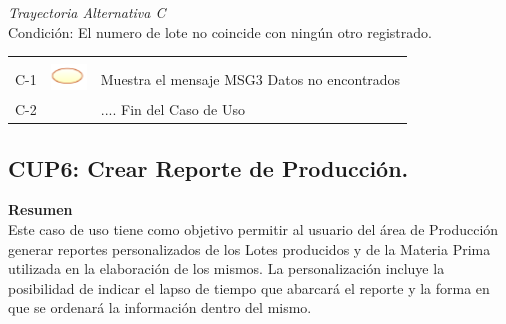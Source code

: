 \documentclass[10pt,spanish]{article}
\providecommand{\tabularnewline}{\\}
\begin{document}
	\textit{Trayectoria Alternativa C}\\
	Condición: El numero de lote no coincide con ningún otro registrado.\\
	\begin{tabular}{ccl}
	& & \tabularnewline
	C-1 & \includegraphics{sistema} & Muestra el mensaje MSG3 Datos no encontrados\tabularnewline	
	C-2 & & .... Fin del Caso de Uso\tabularnewline
	\end{tabular}	

\newpage
		\subsection{CUP6: Crear Reporte de Producción.}

		\textbf{\large Resumen}{\large }\\
		{Este caso de uso tiene como objetivo permitir al usuario del área de Producción generar reportes personalizados de los Lotes producidos  y de la Materia Prima utilizada en la elaboración de los mismos. La personalización incluye la posibilidad de indicar el lapso de tiempo que abarcará el reporte y la forma en que se ordenará la información dentro del mismo. }\\
		{\large \par}
\end{document}
